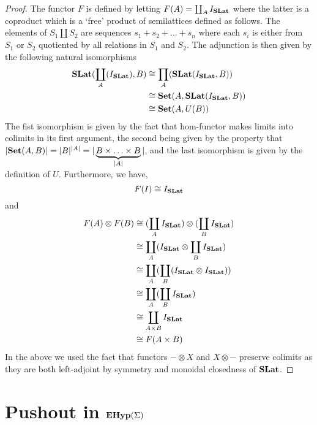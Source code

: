 \begin{proof}
	The functor $F$ is defined by letting $F(A) = \coprod_{A} I_{\mathbf{SLat}}$ where the latter is a coproduct which is a `free' product of semilattices defined as follows.
	The elements of $S_{1} \coprod S_{2}$ are sequences $s_{1} + s_{2} + \ldots + s_{n}$ where each $s_{i}$ is either from $S_{1}$ or $S_{2}$ quotiented by all relations in $S_{1}$ and $S_{2}$.
	The adjunction is then given by the following natural isomorphisms
	\begin{align*}
		\mathbf{SLat}(\coprod_{A}(I_{\mathbf{SLat}}), B) & \cong \prod_{A}(\mathbf{SLat}(I_{\mathbf{SLat}}, B))       \\
		                                                   & \cong \mathbf{Set}(A,\mathbf{SLat}(I_{\mathbf{SLat}}, B)) \\
		                                                   & \cong \mathbf{Set}(A, U(B))
	\end{align*}
	The fist isomorphism is given by the fact that hom-functor makes limits into colimits in its first argument, the second being given by the property that $|\mathbf{Set}(A,B)| = |B|^{|A|} = |\underbrace{B \times \ldots \times B}_{|A|}|$, and the last isomorphism is given by the definition of $U$.
	Furthermore, we have,
	\[
		F(I) \cong I_{\mathbf{SLat}}
	\]
	and
	\begin{align*}
		F(A) \otimes F(B) & \cong (\coprod_{A} I_{\mathbf{SLat}}) \otimes (\coprod_{B} I_{\mathbf{SLat}}) \\
		                  & \cong \coprod_{A} (I_{\mathbf{SLat}} \otimes \coprod_{B} I_{\mathbf{SLat}})   \\
		                  & \cong \coprod_{A} (\coprod_{B} (I_{\mathbf{SLat}} \otimes I_{\mathbf{SLat}})) \\
		                  & \cong \coprod_{A} (\coprod_{B} I_{\mathbf{SLat}})                              \\
		                  & \cong \coprod_{A \times B} I_{\mathbf{SLat}}                                   \\
		                  & \cong F(A \times B)
	\end{align*}
	In the above we used the fact that functors $- \otimes X$ and $X \otimes -$ preserve colimits as they are both left-adjoint by symmetry and monoidal closedness of $\mathbf{SLat}$.
\end{proof}

\section{Pushout in $\mathbf{EHyp}(\Sigma)$}
\label{sec:appendix:pushout}

